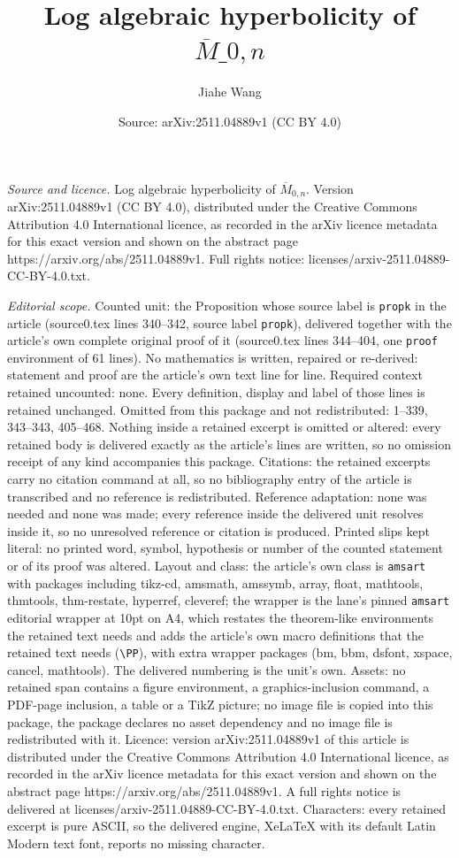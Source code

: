 \documentclass[10pt,a4paper]{amsart}
\title[Log algebraic hyperbolicity of $\overline{M}\_{0,n}$]{Log algebraic hyperbolicity of $\overline{M}\_{0,n}$}
\author{Jiahe Wang}
\date{Source: arXiv:2511.04889v1 (CC BY 4.0)}
\begin{document}
\maketitle

\noindent\emph{Source and licence.} Log algebraic hyperbolicity of $\overline{M}_{0,n}$. Version arXiv:2511.04889v1 (CC BY 4.0), distributed under the Creative Commons Attribution 4.0 International licence, as recorded in the arXiv licence metadata for this exact version and shown on the abstract page https://arxiv.org/abs/2511.04889v1. Full rights notice: licenses/arxiv-2511.04889-CC-BY-4.0.txt.\par\smallskip

\noindent\textit{Editorial scope.} Counted unit: the Proposition whose source label is \texttt{propk} in the article (source0.tex lines 340--342, source label \texttt{propk}), delivered together with the article's own complete original proof of it (source0.tex lines 344--404, one \texttt{proof} environment of 61 lines). No mathematics is written, repaired or re-derived: statement and proof are the article's own text line for line. Required context retained uncounted: none. Every definition, display and label of those lines is retained unchanged. Omitted from this package and not redistributed: 1--339, 343--343, 405--468. Nothing inside a retained excerpt is omitted or altered: every retained body is delivered exactly as the article's lines are written, so no omission receipt of any kind accompanies this package. Citations: the retained excerpts carry no citation command at all, so no bibliography entry of the article is transcribed and no reference is redistributed. Reference adaptation: none was needed and none was made; every reference inside the delivered unit resolves inside it, so no unresolved reference or citation is produced. Printed slips kept literal: no printed word, symbol, hypothesis or number of the counted statement or of its proof was altered. Layout and class: the article's own class is \texttt{amsart} with packages including tikz-cd, amsmath, amssymb, array, float, mathtools, thmtools, thm-restate, hyperref, cleveref; the wrapper is the lane's pinned \texttt{amsart} editorial wrapper at 10pt on A4, which restates the theorem-like environments the retained text needs and adds the article's own macro definitions that the retained text needs (\texttt{\textbackslash PP}), with extra wrapper packages (bm, bbm, dsfont, xspace, cancel, mathtools). The delivered numbering is the unit's own. Assets: no retained span contains a figure environment, a graphics-inclusion command, a PDF-page inclusion, a table or a TikZ picture; no image file is copied into this package, the package declares no asset dependency and no image file is redistributed with it. Licence: version arXiv:2511.04889v1 of this article is distributed under the Creative Commons Attribution 4.0 International licence, as recorded in the arXiv licence metadata for this exact version and shown on the abstract page https://arxiv.org/abs/2511.04889v1. A full rights notice is delivered at licenses/arxiv-2511.04889-CC-BY-4.0.txt. Characters: every retained excerpt is pure ASCII, so the delivered engine, XeLaTeX with its default Latin Modern text font, reports no missing character.
\end{document}
